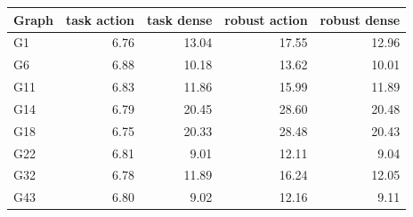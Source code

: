 \begin{tabular}{lrrrr}\toprule
Graph & task action & task dense & robust action & robust dense \\
\midrule
G1 & 6.76 & 13.04 & 17.55 & 12.96 \\
G6 & 6.88 & 10.18 & 13.62 & 10.01 \\
G11 & 6.83 & 11.86 & 15.99 & 11.89 \\
G14 & 6.79 & 20.45 & 28.60 & 20.48 \\
G18 & 6.75 & 20.33 & 28.48 & 20.43 \\
G22 & 6.81 & 9.01 & 12.11 & 9.04 \\
G32 & 6.78 & 11.89 & 16.24 & 12.05 \\
G43 & 6.80 & 9.02 & 12.16 & 9.11 \\
\bottomrule\end{tabular}
